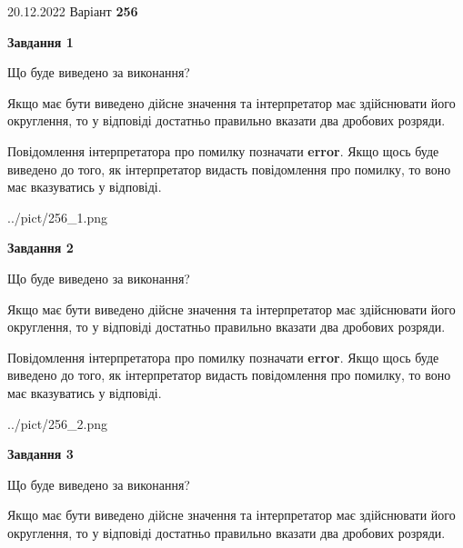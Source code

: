 \documentclass[12pt, ukrainian]{article}
\begin{document}
{20.12.2022 Варіант \No \textbf { 256 }\par}
{
\begin {Large}

{\begin {center}\textbf{Завдання 1}\end {center}}\par
Що буде виведено за виконання? \par

Якщо має бути виведено дійсне значення та інтерпретатор має здійснювати його округлення, 
то у відповіді достатньо правильно вказати два дробових розряди.

Повідомлення інтерпретатора про помилку позначати \textbf{error}.
Якщо щось буде виведено до того, як інтерпретатор видасть повідомлення про помилку, 
то воно має вказуватись у відповіді. \par

\begin{center}
	{../pict/256_1.png}
\end{center}
\newpage

{\begin {center}\textbf{Завдання 2}\end {center}}\par
Що буде виведено за виконання? \par

Якщо має бути виведено дійсне значення та інтерпретатор має здійснювати його округлення, 
то у відповіді достатньо правильно вказати два дробових розряди.

Повідомлення інтерпретатора про помилку позначати \textbf{error}.
Якщо щось буде виведено до того, як інтерпретатор видасть повідомлення про помилку, 
то воно має вказуватись у відповіді. \par

\begin{center}
	{../pict/256_2.png}
\end{center}
\newpage

{\begin {center}\textbf{Завдання 3}\end {center}}\par
Що буде виведено за виконання? \par

Якщо має бути виведено дійсне значення та інтерпретатор має здійснювати його округлення, 
то у відповіді достатньо правильно вказати два дробових розряди.


\end{Large}}
\end{document}
